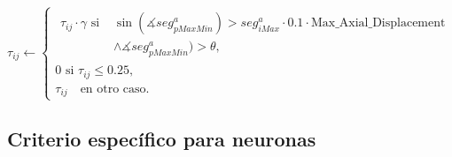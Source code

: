 \begin{equation}
    \tau_{ij} \leftarrow
        \begin{cases}
        \begin{split}
         \tau_{ij} \cdot \gamma \text{ si } & \sin(\measuredangle seg^{a}_{pMaxMin}) > seg^{a}_{iMax} \cdot 0.1 \cdot \text{Max\_Axial\_Displacement} \\ & \land \measuredangle seg^{a}_{pMaxMin}) > \theta,
        \end{split}
        \\[3ex]
        
        \text{0 si } \tau_{ij} \leq 0.25, \\[3ex]
        \tau_{ij} \quad \text{en otro caso}.
        \end{cases}
    \label{eq:antiPheroSAP_Axial}
\end{equation}






\subsection{Criterio espec\'ifico para neuronas}
\label{subsec:pheroNeurons}

